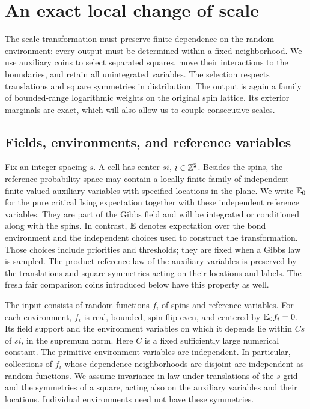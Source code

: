 \section{An exact local change of scale}\label{sec:local-map}

The scale transformation must preserve finite dependence on the
random environment: every output must be determined within a fixed
neighborhood.  We use auxiliary coins to select separated squares,
move their interactions to the boundaries, and retain all unintegrated
variables.  The selection respects translations and square symmetries
in distribution.  The output is again a family of bounded-range
logarithmic weights on the original spin lattice.  Its exterior marginals
are exact, which will also allow us to couple consecutive scales.

\subsection{Fields, environments, and reference variables}

Fix an integer spacing $s$.  A cell has center $si$, $i\in\mathbb Z^2$.
Besides the spins, the reference probability space may contain a locally
finite family of independent finite-valued auxiliary variables with
specified locations in the plane.
We write $\mathbb E_0$ for the pure critical Ising expectation together with these
independent reference variables.  They are part of the Gibbs field and
will be integrated or conditioned along with the spins.  In contrast,
$\mathbb E$ denotes expectation over the bond environment and the independent
choices used to construct the transformation.  Those choices include
priorities and thresholds; they are fixed when a Gibbs law is sampled.
The product reference law of the auxiliary variables is preserved by
the translations and square symmetries acting on their locations and
labels.  The fresh fair comparison coins introduced below have this
property as well.

The input consists of random functions $f_i$ of spins and reference
variables.  For each environment, $f_i$ is real, bounded, spin-flip even,
and centered by $\mathbb E_0f_i=0$.  Its field support and the environment variables
on which it depends lie within $Cs$ of $si$, in the supremum norm.
Here $C$ is a fixed sufficiently large numerical constant.  The primitive
environment variables are independent.  In particular, collections of
$f_i$ whose dependence neighborhoods are disjoint are independent as
random functions.  We assume invariance in law under translations of the
$s$-grid and the symmetries of a square, acting also on the auxiliary
variables and their locations.  Individual environments need not have
these symmetries.

